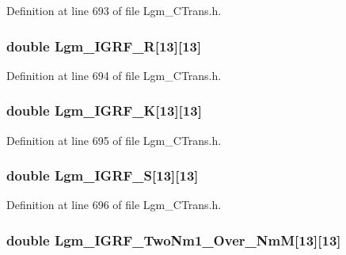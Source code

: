 Definition at line 693 of file Lgm\_\-CTrans.h.\hypertarget{struct_lgm___c_trans_62099f52bc9f00a420106275ee55dacb}{
\subsubsection[{Lgm\_\-IGRF\_\-R}]{\setlength{\rightskip}{0pt plus 5cm}double {\bf Lgm\_\-IGRF\_\-R}\mbox{[}13\mbox{]}\mbox{[}13\mbox{]}}}
\label{struct_lgm___c_trans_62099f52bc9f00a420106275ee55dacb}




Definition at line 694 of file Lgm\_\-CTrans.h.\hypertarget{struct_lgm___c_trans_50a4c2c4f015a684f40fe14a3d4dcc80}{
\subsubsection[{Lgm\_\-IGRF\_\-K}]{\setlength{\rightskip}{0pt plus 5cm}double {\bf Lgm\_\-IGRF\_\-K}\mbox{[}13\mbox{]}\mbox{[}13\mbox{]}}}
\label{struct_lgm___c_trans_50a4c2c4f015a684f40fe14a3d4dcc80}




Definition at line 695 of file Lgm\_\-CTrans.h.\hypertarget{struct_lgm___c_trans_6c8cb5804769345f93dc684349e5232f}{
\subsubsection[{Lgm\_\-IGRF\_\-S}]{\setlength{\rightskip}{0pt plus 5cm}double {\bf Lgm\_\-IGRF\_\-S}\mbox{[}13\mbox{]}\mbox{[}13\mbox{]}}}
\label{struct_lgm___c_trans_6c8cb5804769345f93dc684349e5232f}




Definition at line 696 of file Lgm\_\-CTrans.h.\hypertarget{struct_lgm___c_trans_c6a0474a9ba424b11192a468df4b71bf}{
\subsubsection[{Lgm\_\-IGRF\_\-TwoNm1\_\-Over\_\-NmM}]{\setlength{\rightskip}{0pt plus 5cm}double {\bf Lgm\_\-IGRF\_\-TwoNm1\_\-Over\_\-NmM}\mbox{[}13\mbox{]}\mbox{[}13\mbox{]}}}
\label{struct_lgm___c_trans_c6a0474a9ba424b11192a468df4b71bf}




